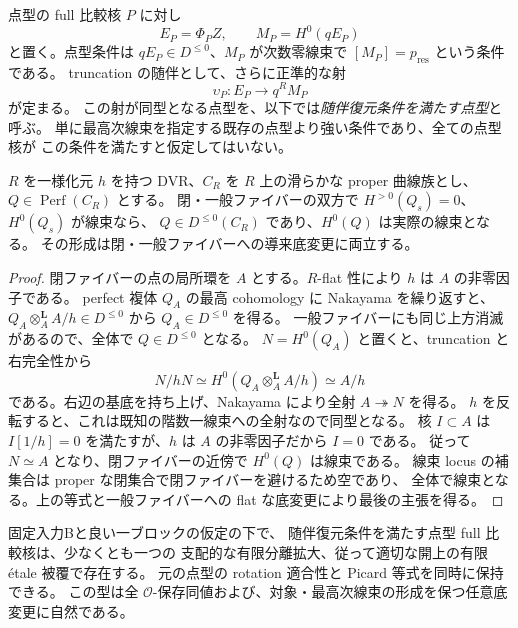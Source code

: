 点型の full 比較核 $P$ に対し
\[
 E_P=\Phi_P Z,\qquad M_P=H^0(qE_P)
\]
と置く。点型条件は $qE_P\in D^{\le0}$、$M_P$ が次数零線束で
$[M_P]=p_{\mathrm{res}}$ という条件である。
truncation の随伴として、さらに正準的な射
\begin{equation}\label{eq:nfm-top-line-adjoint-reconstruction}
 \upsilon_P:E_P\longrightarrow q^R M_P
\end{equation}
が定まる。
この射が同型となる点型を、以下では\emph{随伴復元条件を満たす点型}と呼ぶ。
単に最高次線束を指定する既存の点型より強い条件であり、全ての点型核が
この条件を満たすと仮定してはいない。

\begin{lemma}[閉・一般ファイバーの最高次線束の持上げ]
\label{lem:nfm-dvr-top-line-lifting}
$R$ を一様化元 $h$ を持つ DVR、$C_R$ を $R$ 上の滑らかな proper 曲線族とし、
$Q\in\operatorname{Perf}(C_R)$ とする。
閉・一般ファイバーの双方で $H^{>0}(Q_s)=0$、$H^0(Q_s)$ が線束なら、
$Q\in D^{\le0}(C_R)$ であり、$H^0(Q)$ は実際の線束となる。
その形成は閉・一般ファイバーへの導来底変更に両立する。
\end{lemma}

\begin{proof}
閉ファイバーの点の局所環を $A$ とする。$R$-flat 性により $h$ は $A$ の非零因子である。
perfect 複体 $Q_A$ の最高 cohomology に Nakayama を繰り返すと、
$Q_A\otimes_A^{\mathbf L}A/h\in D^{\le0}$ から $Q_A\in D^{\le0}$ を得る。
一般ファイバーにも同じ上方消滅があるので、全体で $Q\in D^{\le0}$ となる。
$N=H^0(Q_A)$ と置くと、truncation と右完全性から
\[
 N/hN\simeq H^0(Q_A\otimes_A^{\mathbf L}A/h)\simeq A/h
\]
である。右辺の基底を持ち上げ、Nakayama により全射 $A\twoheadrightarrow N$ を得る。
$h$ を反転すると、これは既知の階数一線束への全射なので同型となる。
核 $I\subset A$ は $I[1/h]=0$ を満たすが、$h$ は $A$ の非零因子だから $I=0$ である。
従って $N\simeq A$ となり、閉ファイバーの近傍で $H^0(Q)$ は線束である。
線束 locus の補集合は proper な閉集合で閉ファイバーを避けるため空であり、
全体で線束となる。上の等式と一般ファイバーへの flat な底変更により最後の主張を得る。
\end{proof}

\begin{proposition}[随伴復元条件を満たす点型の非空性]
\label{prop:nfm-adjoint-point-type-nonempty}
固定入力Bと良い一ブロックの仮定の下で、
随伴復元条件を満たす点型 full 比較核は、少なくとも一つの
支配的な有限分離拡大、従って適切な開上の有限 \'etale 被覆で存在する。
元の点型の rotation 適合性と Picard 等式を同時に保持できる。
この型は全 $\mathcal O$-保存同値および、対象・最高次線束の形成を保つ任意底変更に自然である。
\end{proposition}

